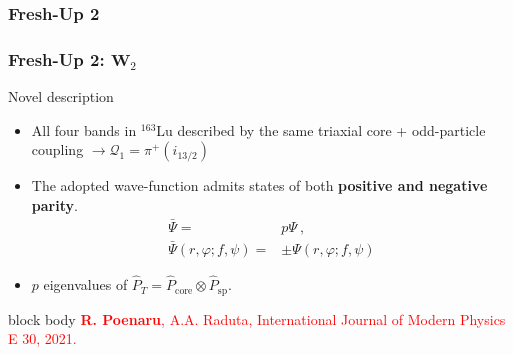 \documentclass{beamer}
\begin{document}
\subsubsection{Fresh-Up 2}

\begin{frame}
	\frametitle{Fresh-Up 2: $\mathbf{W}_2$}
	\begin{block}{Novel description}
		\begin{itemize}
			\item All four bands in $^{163}$Lu described by the same triaxial core + odd-particle coupling $\longrightarrow \mathcal{Q}_1=\pi^+(i_{13/2})$
			\item The adopted wave-function admits states of both \textbf{positive and negative parity}.
			\begin{align}
				\bar{\Psi}=&p\Psi\nonumber\ ,\\
				\bar{\Psi}(r,\varphi;f,\psi)=&\pm\Psi(r,\varphi;f,\psi)\nonumber
			\end{align}
			\item $p$ eigenvalues of $\hat{P}_T=\hat{P}_\text{core}\otimes\hat{P}_\text{sp}$.
		\end{itemize}
	\end{block}
	\begin{beamercolorbox}[rounded=true,shadow=false, wd=\linewidth,]{block body}
		\centering
		\textcolor{red}{\footnotesize{\textbf{R. Poenaru}, A.A. Raduta, International Journal of Modern Physics E 30, 2021.}}
	\end{beamercolorbox}
\end{frame}
\end{document}
